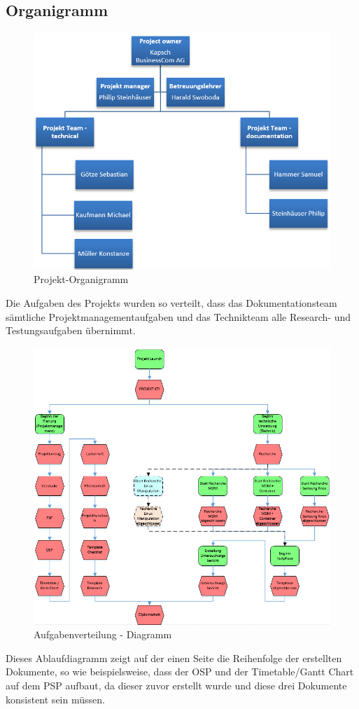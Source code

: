 \subsection{Organigramm}
\begin{figure}[H]
	\centering
	\includegraphics[scale=0.6]{Images/organigramm}
	\caption{Projekt-Organigramm}
\end{figure}
Die Aufgaben des Projekts wurden so verteilt, dass das Dokumentationsteam sämtliche Projektmanagementaufgaben und das Technikteam alle Research- und Testungsaufgaben übernimmt.
\begin{figure}[H]
	\includegraphics[scale=0.7]{Images/arbeitsteilung}
	\caption{Aufgabenverteilung - Diagramm}
\end{figure}
Dieses Ablaufdiagramm zeigt auf der einen Seite die Reihenfolge der erstellten Dokumente, so wie beispielsweise, dass der OSP und der Timetable/Gantt Chart auf dem PSP aufbaut, da dieser zuvor erstellt wurde und diese drei Dokumente konsistent sein müssen.
